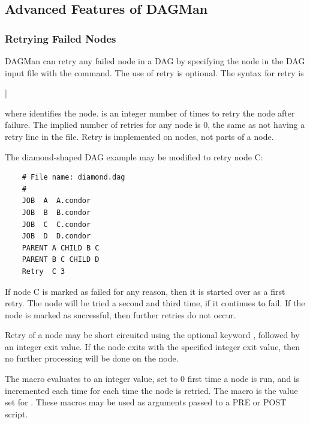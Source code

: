 \subsection{\label{sec:AdvDAGMan}Advanced Features of DAGMan}


\subsubsection{\label{dagman:retry}Retrying Failed Nodes}

DAGMan can retry any failed node in a DAG by
specifying the node in the DAG input file 
with the  command.
The use of retry is optional.
The syntax for retry is

 | 

where  identifies the node.
 is an integer
number of times to retry the node after failure.
The implied number of retries for any node is 0,
the same as not having a retry line in the file. 
Retry is implemented on nodes, not parts of a node.

The diamond-shaped DAG example may be modified to
retry node C:

\footnotesize
\begin{verbatim}
    # File name: diamond.dag
    #
    JOB  A  A.condor 
    JOB  B  B.condor 
    JOB  C  C.condor	
    JOB  D  D.condor
    PARENT A CHILD B C
    PARENT B C CHILD D
    Retry  C 3
\end{verbatim}
\normalsize

If node C is marked as failed for any reason,
then it is started over as a first retry.
The node will be tried a second and third time,
if it continues to fail.
If the node is marked as successful, then further retries do not occur.

Retry of a node may be short circuited using the
optional keyword , followed by an integer exit value.
If the node exits with the specified integer exit value,
then no further processing will be done
on the node. 

The macro  evaluates to an 
integer value, set to 0 first time a node is run,
and is incremented each time for each time the node is retried. 
The macro  is the value set for
.
These macros may be used as arguments passed to a PRE or POST script.

